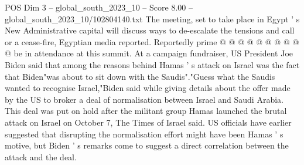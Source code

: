 \begin{textsample}{POS Dim 3 – global\_south\_2023\_10 – Score 8.00 – global\_south\_2023\_10/102804140.txt}
The meeting, set to take place in Egypt ' s New Administrative capital will discuss ways to de-escalate the tensions and call or a cease-fire, Egyptian media reported.
Reportedly prime @ @ @ @ @ @ @ @ @ @ be in attendance at this summit.
At a campaign fundraiser, US President Joe Biden said that among the reasons behind Hamas ' s attack on Israel was the fact that Biden"was about to sit down with the Saudis"."Guess what the Saudis wanted to recognise Israel,"Biden said while giving details about the offer made by the US to broker a deal of normalisation between Israel and Saudi Arabia.
This deal was put on hold after the militant group Hamas launched the brutal attack on Israel on October 7, The Times of Israel said.
US officials have earlier suggested that disrupting the normalisation effort might have been Hamas ' s motive, but Biden ' s remarks come to suggest a direct correlation between the attack and the deal.

\end{textsample}

